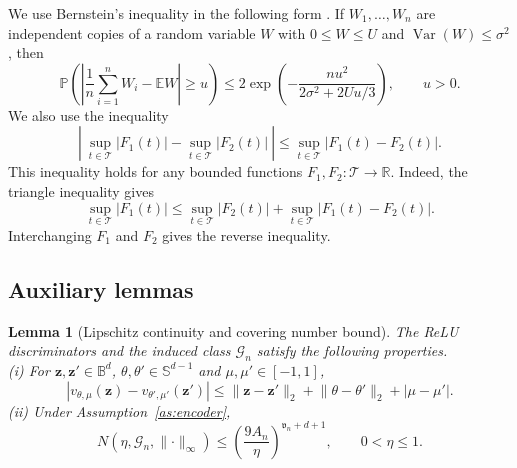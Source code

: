 \documentclass{article} %
\newtheorem{lemma}[theorem]{Lemma}
\begin{document}
We use Bernstein's inequality in the following form \citep[Chapter~2]{boucheron2013concentration}.  If $W_1,\ldots,W_n$ are independent copies of a random variable $W$ with $0\le W\le U$ and $\operatorname{Var}(W)\le\sigma^2$, then
\begin{equation}
  \mathbb{P}\left(\left|\frac{1}{n}\sum_{i=1}^nW_i-\mathbb{E}W\right|\ge u\right)
  \le2\exp\left(-\frac{nu^2}{2\sigma^2+2Uu/3}\right),
  \qquad u>0 .
  \label{eq:bernstein}
\end{equation}
We also use the inequality
\begin{equation}
  \left|\ \sup_{t\in\mathcal{T}}|F_1(t)|-\sup_{t\in\mathcal{T}}|F_2(t)|\ \right|
  \le\sup_{t\in\mathcal{T}}\left|F_1(t)-F_2(t)\right|.
  \label{eq:sup-diff}
\end{equation}
This inequality holds for any bounded functions
$F_1,F_2:\mathcal{T}\to\mathbb{R}$. Indeed, the triangle inequality gives
\begin{equation*}
    \sup_{t\in\mathcal{T}} |F_1(t)|
    \le
    \sup_{t\in\mathcal{T}} |F_2(t)|
    +
    \sup_{t\in\mathcal{T}} |F_1(t)-F_2(t)|.
\end{equation*}
Interchanging $F_1$ and $F_2$ gives the reverse inequality.


\subsection{Auxiliary lemmas}
\label{app:lemmas}

\begin{lemma}[Lipschitz continuity and covering number bound]
\label{lem:entropy}
The ReLU discriminators and the induced class $\mathcal{G}_n$
satisfy the following properties. \\
\emph{(i)} For $\mathbf{z},\mathbf{z}'\in\mathbb{B}^d$, $\theta,\theta'\in\mathbb{S}^{d-1}$ and $\mu,\mu'\in[-1,1]$,
\[
  \left|v_{\theta,\mu}(\mathbf{z})-v_{\theta',\mu'}(\mathbf{z}')\right|
  \le\lVert\mathbf{z}-\mathbf{z}'\rVert_2+\lVert\theta-\theta'\rVert_2+|\mu-\mu'| .
\]
\emph{(ii)} Under Assumption~\ref{as:encoder},
\[
  N(\eta,\mathcal{G}_n,\lVert\cdot\rVert_\infty)
  \le\left(\frac{9A_n}{\eta}\right)^{\mathfrak{v}_n+d+1},
  \qquad 0<\eta\le1 .
\]
\end{lemma}
\end{document}
